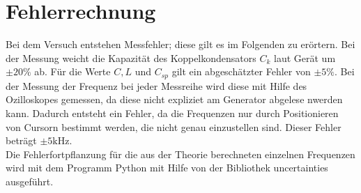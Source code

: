 \section{Fehlerrechnung}
 \label{fehlerrechnung}
Bei dem Versuch entstehen Messfehler;
diese gilt es im Folgenden zu erörtern.
Bei der Messung weicht die Kapazität des Koppelkondensators $C_k$ laut Gerät um $\pm 20 \%$ ab. Für die Werte $C,L $ und $C_{sp}$ gilt
ein abgeschätzter Fehler von  $\pm 5\si{\percent}$.
Bei der Messung der Frequenz bei jeder Messreihe
wird diese mit Hilfe des Ozilloskopes gemessen,
da diese nicht expliziet am Generator abgelese nwerden kann.
Dadurch entsteht ein Fehler, da die Frequenzen
nur durch Positionieren von Cursorn bestimmt werden,
die nicht genau einzustellen sind. Dieser Fehler beträgt $\pm 5 \si{\kilo\hertz}$.
\\
Die Fehlerfortpflanzung für die aus der Theorie berechneten einzelnen Frequenzen
 wird mit%
dem Programm Python mit Hilfe von der Bibliothek uncertainties ausgeführt.
